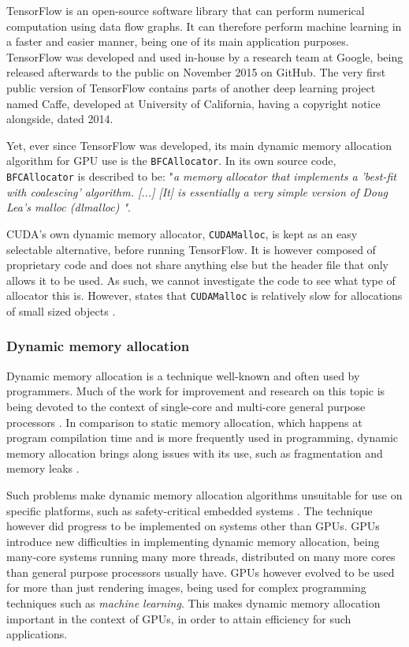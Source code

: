 \documentclass[12pt,twoside]{article}
\begin{document}
TensorFlow is an open-source software library that can perform numerical computation using data flow graphs. It can therefore perform machine learning in a faster and easier manner, being one of its main application purposes. TensorFlow was developed and used in-house by a research team at Google, being released afterwards to the public on November 2015 on GitHub. The very first public version of TensorFlow contains parts of another deep learning project named Caffe, developed at University of California, having a copyright notice alongside, dated 2014.

Yet, ever since TensorFlow was developed, its main dynamic memory allocation algorithm for GPU use is the \texttt{BFCAllocator}. In its own source code, \texttt{BFCAllocator} is described to be: "\textit{a memory allocator that implements a 'best-fit with coalescing' algorithm.  [...] [It] is essentially a very simple version of Doug Lea's malloc (dlmalloc) \cite{dlmalloc}"}.

CUDA's own dynamic memory allocator, \texttt{CUDAMalloc}, is kept as an easy selectable alternative, before running TensorFlow. It is however composed of proprietary code and does not share anything else but the header file that only allows it to be used. As such, we cannot investigate the code to see what type of allocator this is. However, \citeauthor{Vinkler2015} states that \texttt{CUDAMalloc} is relatively slow for allocations of small sized objects \cite{Vinkler2015}.

\subsubsection*{Dynamic memory allocation}

Dynamic memory allocation is a technique well-known and often used by programmers. Much of the work for improvement and research on this topic is being devoted to the context of single-core and multi-core general purpose processors \cite{YOU2015}. In comparison to static memory allocation, which happens at program compilation time and is more frequently used in programming, dynamic memory allocation brings along issues with its use, such as fragmentation and memory leaks \cite{TRAISTER199099}.

Such problems make dynamic memory allocation algorithms unsuitable for use on specific platforms, such as safety-critical embedded systems \cite{Puaut_2002}. The technique however did progress to be implemented on systems other than GPUs. GPUs introduce new difficulties in implementing dynamic memory allocation, being many-core systems running many more threads, distributed on many more cores than general purpose processors usually have. GPUs however evolved to be used for more than just rendering images, being used for complex programming techniques such as \textit{machine learning}. This makes dynamic memory allocation important in the context of GPUs, in order to attain efficiency for such applications.
\end{document}
